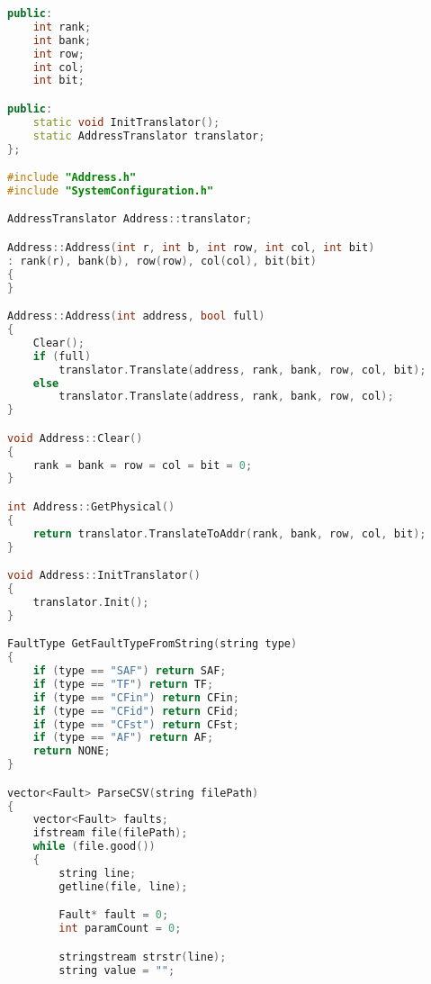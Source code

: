 \begin{lstlisting}[language=C++, style=cplusplusstyle]
public:
	int rank;
	int bank;
	int row;
	int col;
	int bit;

public:
	static void InitTranslator();
	static AddressTranslator translator;
};

#include "Address.h"
#include "SystemConfiguration.h"

AddressTranslator Address::translator;

Address::Address(int r, int b, int row, int col, int bit)
: rank(r), bank(b), row(row), col(col), bit(bit)
{
}

Address::Address(int address, bool full)
{
	Clear();
	if (full)
		translator.Translate(address, rank, bank, row, col, bit);
	else
		translator.Translate(address, rank, bank, row, col);	
}

void Address::Clear()
{
	rank = bank = row = col = bit = 0;
}

int Address::GetPhysical()
{
	return translator.TranslateToAddr(rank, bank, row, col, bit);
}

void Address::InitTranslator()
{
	translator.Init();
}

FaultType GetFaultTypeFromString(string type)
{
	if (type == "SAF") return SAF;
	if (type == "TF") return TF;
	if (type == "CFin") return CFin;
	if (type == "CFid") return CFid;
	if (type == "CFst") return CFst;
	if (type == "AF") return AF;
	return NONE;
}

vector<Fault> ParseCSV(string filePath)
{
	vector<Fault> faults;
	ifstream file(filePath);
	while (file.good())
	{
		string line;
		getline(file, line);

		Fault* fault = 0;
		int paramCount = 0;

		stringstream strstr(line);
		string value = "";


\end{lstlisting}

